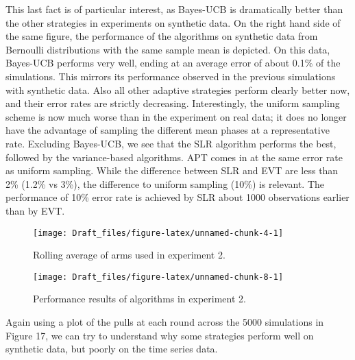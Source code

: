 \documentclass[11pt,]{article}
\begin{document}
This last fact is of particular interest, as Bayes-UCB is dramatically
better than the other strategies in experiments on synthetic data. On
the right hand side of the same figure, the performance of the
algorithms on synthetic data from Bernoulli distributions with the same
sample mean is depicted. On this data, Bayes-UCB performs very well,
ending at an average error of about 0.1\% of the simulations. This
mirrors its performance observed in the previous simulations with
synthetic data. Also all other adaptive strategies perform clearly
better now, and their error rates are strictly decreasing.
Interestingly, the uniform sampling scheme is now much worse than in the
experiment on real data; it does no longer have the advantage of
sampling the different mean phases at a representative rate. Excluding
Bayes-UCB, we see that the SLR algorithm performs the best, followed by
the variance-based algorithms. APT comes in at the same error rate as
uniform sampling. While the difference between SLR and EVT are less than
2\% (1.2\% vs 3\%), the difference to uniform sampling (10\%) is
relevant. The performance of 10\% error rate is achieved by SLR about
1000 observations earlier than by EVT.

\begin{figure}

{\centering \texttt{[image: Draft\_files/figure-latex/unnamed-chunk-4-1]} 

}

\caption{Rolling average of arms used in experiment 2.}\label{fig:unnamed-chunk-4}
\end{figure}

\begin{figure}

{\centering \texttt{[image: Draft\_files/figure-latex/unnamed-chunk-8-1]} 

}

\caption{Performance results of algorithms in experiment 2.}\label{fig:unnamed-chunk-8}
\end{figure}

Again using a plot of the pulls at each round across the 5000
simulations in Figure 17, we can try to understand why some strategies
perform well on synthetic data, but poorly on the time series data.
\end{document}
